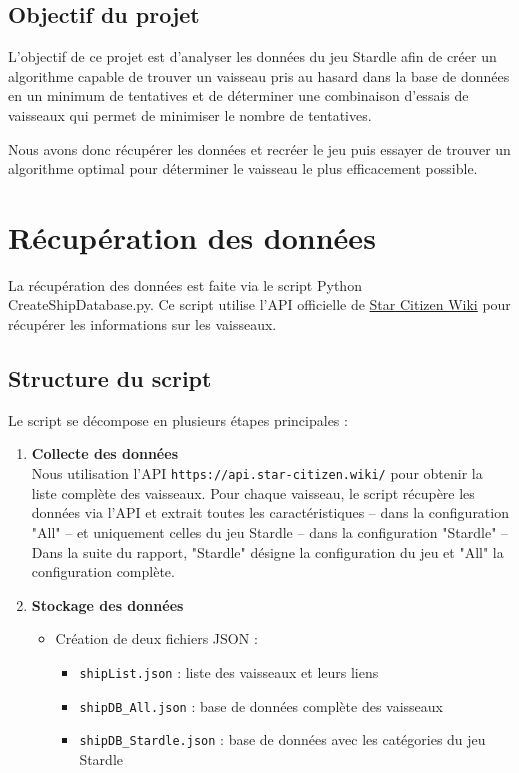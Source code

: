 \documentclass{article}
\begin{document}
\subsection{Objectif du projet}

L'objectif de ce projet est d'analyser les données du jeu Stardle afin de créer un algorithme capable de trouver 
un vaisseau pris au hasard dans la base de données en un minimum de tentatives et de déterminer une combinaison 
d'essais de vaisseaux qui permet de minimiser le nombre de tentatives.

Nous avons donc récupérer les données et recréer le jeu puis essayer de trouver un 
algorithme optimal pour déterminer le vaisseau le plus efficacement possible. 

\section{Récupération des données}
La récupération des données est faite via le script Python CreateShipDatabase.py. 
Ce script utilise l'API officielle de \href{https://starcitizen.tools/}{Star Citizen Wiki}  pour récupérer les informations sur les vaisseaux.

\subsection{Structure du script}
Le script se décompose en plusieurs étapes principales :

\begin{enumerate}   
    \item \textbf{Collecte des données} \\
        Nous utilisation l'API \verb|https://api.star-citizen.wiki/| pour obtenir la liste complète des 
        vaisseaux.
        Pour chaque vaisseau, le script récupère les données via l'API et 
        extrait toutes les caractéristiques -- dans la configuration "All" -- 
        et uniquement celles du jeu Stardle -- dans la configuration  "Stardle" --\\
        Dans la suite du rapport, "Stardle" désigne la configuration du jeu et "All" la configuration complète.
    \item \textbf{Stockage des données}
    
    \begin{itemize}
        \item Création de deux fichiers JSON :
        \begin{itemize}
            \item \verb|shipList.json| : liste des vaisseaux et leurs liens
            \item \verb|shipDB_All.json| : base de données complète des vaisseaux
            \item \verb|shipDB_Stardle.json| : base de données avec les catégories du jeu Stardle 
        \end{itemize}
    \end{itemize}
\end{enumerate}
\end{document}
